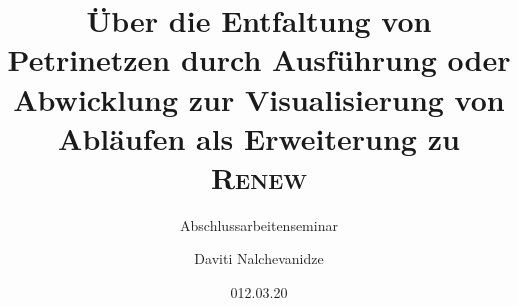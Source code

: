 \documentclass[compress]{beamer}
\title[Prozessgenerierung aus Petrinetzen]{Über die Entfaltung von Petrinetzen durch Ausführung oder Abwicklung zur Visualisierung von Abläufen als Erweiterung zu \textsc{Renew}}
\subtitle{Abschlussarbeitenseminar}
\author{Daviti Nalchevanidze}
\date{012.03.20}
\begin{document}
\begin{frame}
	\titlepage
\end{frame}

\begin{frame}
	\tableofcontents
\end{frame}



\setcounter{framenumber}{\value{finalframe}}
\end{document}
